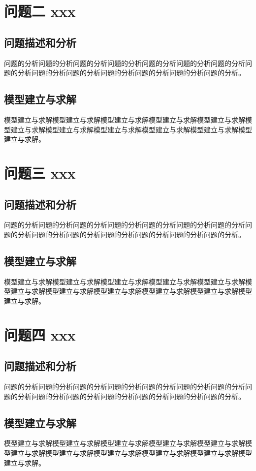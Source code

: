 \documentclass[bwprint]{gmcmthesis}
\numberwithin{figure}{section}
\begin{document}
\section{问题二 xxx}
\subsection{问题描述和分析}
问题的分析问题的分析问题的分析问题的分析问题的分析问题的分析问题的分析问题的分析问题的分析问题的分析问题的分析问题的分析问题的分析问题的分析。
\subsection{模型建立与求解}
模型建立与求解模型建立与求解模型建立与求解模型建立与求解模型建立与求解模型建立与求解模型建立与求解模型建立与求解模型建立与求解模型建立与求解模型建立与求解。

\section{问题三 xxx}
\subsection{问题描述和分析}
问题的分析问题的分析问题的分析问题的分析问题的分析问题的分析问题的分析问题的分析问题的分析问题的分析问题的分析问题的分析问题的分析问题的分析。
\subsection{模型建立与求解}
模型建立与求解模型建立与求解模型建立与求解模型建立与求解模型建立与求解模型建立与求解模型建立与求解模型建立与求解模型建立与求解模型建立与求解模型建立与求解。

\section{问题四 xxx}
\subsection{问题描述和分析}
问题的分析问题的分析问题的分析问题的分析问题的分析问题的分析问题的分析问题的分析问题的分析问题的分析问题的分析问题的分析问题的分析问题的分析。
\subsection{模型建立与求解}
模型建立与求解模型建立与求解模型建立与求解模型建立与求解模型建立与求解模型建立与求解模型建立与求解模型建立与求解模型建立与求解模型建立与求解模型建立与求解。
\end{document}

